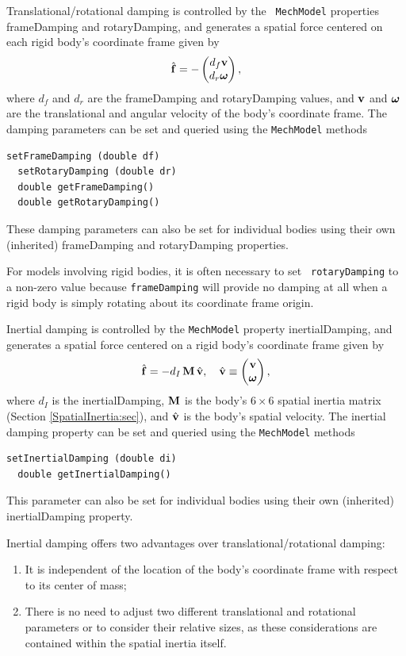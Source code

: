 Translational/rotational damping is controlled by the {\tt
MechModel} properties {\sf frameDamping} and {\sf rotaryDamping}, and
generates a spatial force centered on each rigid body's coordinate
frame given by
%
\begin{equation}
\hat{{\bf f}} = - \left(\begin{matrix} d_f {\bf v} \\ d_r \boldsymbol\omega \end{matrix}\right),
\end{equation}
%
where $d_f$ and $d_r$ are the {\sf frameDamping} and {\sf
rotaryDamping} values, and ${\bf v}$ and $\boldsymbol\omega$ are the translational
and angular velocity of the body's coordinate frame.  The damping
parameters can be set and queried using the {\tt MechModel} methods
\begin{lstlisting}[]
  setFrameDamping (double df)
  setRotaryDamping (double dr)
  double getFrameDamping()
  double getRotaryDamping()
\end{lstlisting}
%
These damping parameters can also be set for individual bodies using
their own (inherited) {\sf frameDamping} and {\sf rotaryDamping}
properties.

\begin{sideblock}
For models involving rigid bodies, it is often necessary to set {\tt
rotaryDamping} to a non-zero value because {\tt frameDamping} will
provide no damping at all when a rigid body is simply rotating about
its coordinate frame origin.
\end{sideblock}

Inertial damping is controlled by the {\tt MechModel} property {\sf
inertialDamping}, and generates a spatial force centered on a rigid
body's coordinate frame given by
%
\begin{equation}
\hat{{\bf f}} = -d_I \, {\bf M} \, \hat{{\bf v}}, \quad \hat{{\bf v}} \equiv 
\left(\begin{matrix} {\bf v} \\ \boldsymbol\omega \end{matrix}\right),
\end{equation}
%
where $d_I$ is the {\sf inertialDamping}, ${\bf M}$ is the body's $6 \times
6$ spatial inertia matrix (Section \ref{SpatialInertia:sec}), and
$\hat{{\bf v}}$ is the body's spatial velocity. The inertial damping property
can be set and queried using the {\tt MechModel} methods
\begin{lstlisting}[]
  setInertialDamping (double di)
  double getInertialDamping()
\end{lstlisting}
%
This parameter can also be set for individual bodies using their own
(inherited) {\sf inertialDamping} property.

\begin{sideblock}
Inertial damping offers two advantages over translational/rotational damping:
\begin{enumerate}

\item It is independent of the location of the body's coordinate
frame with respect to its center of mass;

\item 
There is no need to adjust two different translational and rotational
parameters or to consider their relative sizes, as these
considerations are contained within the spatial inertia itself.

\end{enumerate}
\end{sideblock}

